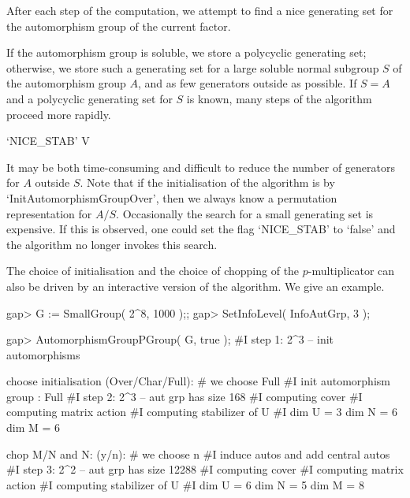 After each step of the computation, we attempt to  find a nice generating
set for the automorphism group of the current factor.

If the automorphism group is soluble, we store a polycyclic generating
set; otherwise,  we store  such a generating  set for a  large soluble
normal  subgroup $S$ of the automorphism group $A$, and as few generators 
outside  as  possible. If $S = A$ and a polycyclic  generating set for
$S$ is known,  many steps  of  the algorithm proceed more rapidly. 

\>`NICE_STAB' V

It may be both time-consuming and difficult to reduce the number of 
generators for $A$ outside $S$. Note that if the initialisation of the 
algorithm is by `InitAutomorphismGroupOver', then we always know a 
permutation representation for $A/S$. Occasionally the search for 
a small generating set is expensive.  If this is  observed, one 
could set the flag `NICE_STAB' to  `false'  and  the  algorithm  no  
longer  invokes this search.


The choice of initialisation and the choice of chopping of the 
$p$-multiplicator can also be driven by an interactive version
of the algorithm. We give an example.

\beginexample
gap> G := SmallGroup( 2^8, 1000 );;
gap> SetInfoLevel( InfoAutGrp, 3 );

gap> AutomorphismGroupPGroup( G, true );
#I  step 1: 2^3 -- init automorphisms 

choose initialisation (Over/Char/Full):     # we choose Full 
#I    init automorphism group : Full 
#I  step 2: 2^3 -- aut grp has size 168
#I    computing cover
#I    computing matrix action
#I    computing stabilizer of U
#I    dim U = 3  dim N = 6  dim M = 6

chop M/N and N: (y/n):                      # we choose n
#I    induce autos and add central autos
#I  step 3: 2^2 -- aut grp has size 12288
#I    computing cover
#I    computing matrix action
#I    computing stabilizer of U
#I    dim U = 6  dim N = 5  dim M = 8

